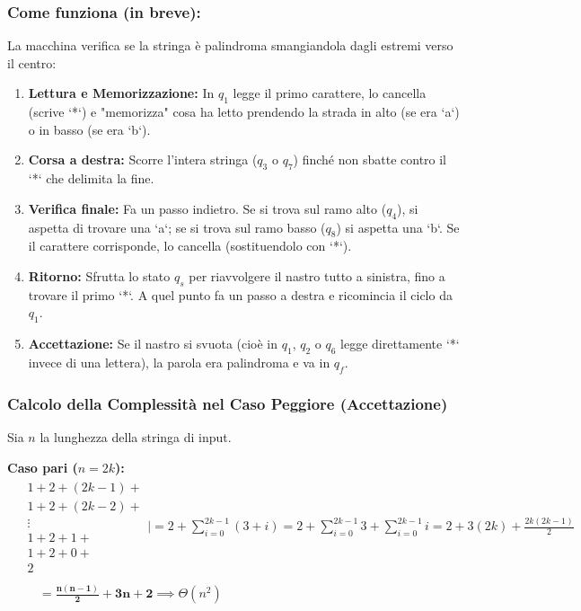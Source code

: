 \subsubsection*{Come funziona (in breve):}
La macchina verifica se la stringa è palindroma smangiandola dagli estremi verso il centro:
\begin{enumerate}
    \item \textbf{Lettura e Memorizzazione:} In $q_1$ legge il primo carattere, lo cancella (scrive `*`) e "memorizza" cosa ha letto prendendo la strada in alto (se era `a`) o in basso (se era `b`).
    \item \textbf{Corsa a destra:} Scorre l'intera stringa ($q_3$ o $q_7$) finché non sbatte contro il `*` che delimita la fine.
    \item \textbf{Verifica finale:} Fa un passo indietro. Se si trova sul ramo alto ($q_4$), si aspetta di trovare una `a`; se si trova sul ramo basso ($q_8$) si aspetta una `b`. Se il carattere corrisponde, lo cancella (sostituendolo con `*`).
    \item \textbf{Ritorno:} Sfrutta lo stato $q_s$ per riavvolgere il nastro tutto a sinistra, fino a trovare il primo `*`. A quel punto fa un passo a destra e ricomincia il ciclo da $q_1$.
    \item \textbf{Accettazione:} Se il nastro si svuota (cioè in $q_1$, $q_2$ o $q_6$ legge direttamente `*` invece di una lettera), la parola era palindroma e va in $q_f$.
\end{enumerate}

\vspace{0.4cm}
\subsubsection*{Calcolo della Complessità nel Caso Peggiore (Accettazione)}
Sia $n$ la lunghezza della stringa di input.

\textbf{Caso pari ($n = 2k$):}
\begin{align*}
    &\begin{array}{l}
        1 + 2 + (2k-1) + \\
        1 + 2 + (2k-2) + \\
        \vdots \\
        1 + 2 + 1 + \\
        1 + 2 + 0 + \\
        2
    \end{array}
    \Bigg| = 2 + \sum_{i=0}^{2k-1} (3+i) = 2 + \sum_{i=0}^{2k-1} 3 + \sum_{i=0}^{2k-1} i = 2 + 3(2k) + \frac{2k(2k-1)}{2} \\
    &\phantom{\begin{array}{l} \vdots \\ 2 \end{array}} = \mathbf{\frac{n(n-1)}{2} + 3n + 2} \implies \Theta(n^2)
\end{align*}

